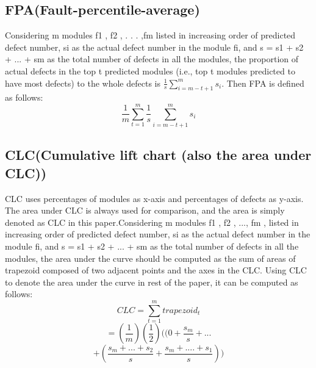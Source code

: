 \subsection{FPA(Fault-percentile-average)}
Considering m modules f1 , f2 , . . . ,fm listed in increasing order of predicted defect number, si as the actual defect number in the module fi, and s = s1 + s2 + ... + sm as the total number
of defects in all the modules, the proportion of actual defects in the top t predicted modules (i.e., top t modules predicted to have most defects) to the whole defects is \(\frac{1}{s}\sum_{i=m-t+1}^{m}s_i\). Then FPA is defined as follows:
\[\frac{1}{m}\sum_{t=1}^{m} \frac{1}{s}\sum_{i=m-t+1}^{m}s_i\] 

\subsection{CLC(Cumulative lift chart (also the area under CLC))}

CLC uses percentages of modules as x-axis and percentages of defects as y-axis. The area under CLC is always used for comparison, and the area is simply denoted as CLC in this paper.Considering m modules f1 , f2 , ..., fm , listed in increasing order of predicted defect number, si as the actual defect number in the module fi, and s = s1 + s2 + ... + sm as the total number of defects in all the modules, the area under the curve should be computed as the sum of areas of trapezoid composed of two adjacent points and the axes in the CLC. Using CLC to denote
the area under the curve in rest of the paper, it can be computed as follows:\cite{clc}
\[CLC = \sum_{t=1}^{m}trapezoid_t\]
\[=(\frac{1}{m})(\frac{1}{2})((0+\frac{s_m}{s}+...\]
\[+(\frac{s_m+...+s_2}{s}+\frac{s_m+....+s_1}{s}))\]

